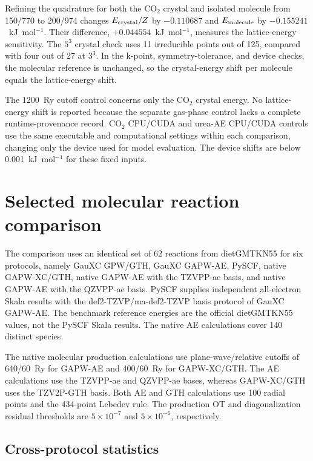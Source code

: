 \documentclass[10pt,a4paper]{article}
\begin{document}
Refining the quadrature for both the CO$_2$ crystal and isolated molecule from 150/770 to 200/974 changes $E_{\rm crystal}/Z$ by $-0.110687$ and $E_{\rm molecule}$ by $-0.155241$~kJ~mol$^{-1}$. Their difference, $+0.044554$~kJ~mol$^{-1}$, measures the lattice-energy sensitivity. The $5^3$ crystal check uses 11 irreducible points out of 125, compared with four out of 27 at $3^3$. In the k-point, symmetry-tolerance, and device checks, the molecular reference is unchanged, so the crystal-energy shift per molecule equals the lattice-energy shift.

The 1200~Ry cutoff control concerns only the CO$_2$ crystal energy. No lattice-energy shift is reported because the separate gas-phase control lacks a complete runtime-provenance record. CO$_2$ CPU/CUDA and urea-AE CPU/CUDA controls use the same executable and computational settings within each comparison, changing only the device used for model evaluation. The device shifts are below 0.001~kJ~mol$^{-1}$ for these fixed inputs.

\FloatBarrier

\section{Selected molecular reaction comparison}
\label{sec:molecular-data}

The comparison uses an identical set of 62 reactions from dietGMTKN55 for six protocols, namely GauXC GPW/GTH, GauXC GAPW-AE, PySCF, native GAPW-XC/GTH, native GAPW-AE with the TZVPP-ae basis, and native GAPW-AE with the QZVPP-ae basis.\cite{Gould2018,Goerigk2017,Poeschel2026MolecularSkala,Battaglia2026DietData} PySCF supplies independent all-electron Skala results with the def2-TZVP/ma-def2-TZVP basis protocol of GauXC GAPW-AE. The benchmark reference energies are the official dietGMTKN55 values, not the PySCF Skala results. The native AE calculations cover 140 distinct species.


The native molecular production calculations use plane-wave/relative cutoffs of 640/60~Ry for GAPW-AE and 400/60~Ry for GAPW-XC/GTH. The AE calculations use the TZVPP-ae and QZVPP-ae bases, whereas GAPW-XC/GTH uses the TZV2P-GTH basis. Both AE and GTH calculations use 100 radial points and the 434-point Lebedev rule. The production OT and diagonalization residual thresholds are $5\times10^{-7}$ and $5\times10^{-6}$, respectively.


\subsection{Cross-protocol statistics}
\label{sec:cross-code}
\end{document}
